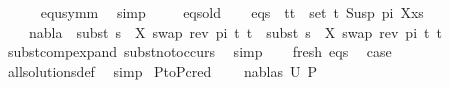 \begin{isabellebody}
\ \ \ \ \isamarkupfalse%
\ equ{\isacharunderscore}{\kern0pt}symm\ \isamarkupfalse%
\ simp\isanewline
\isanewline
\ \ \isamarkupfalse%
\ {}\ eqs{\isacharunderscore}{\kern0pt}old\isanewline
\ \ \isamarkupfalse%
\ eqs{\isacharcolon}{\kern0pt}\ {\isachardoublequoteopen}{\isasymforall}\ {\isacharparenleft}{\kern0pt}t{}{\isacharcomma}{\kern0pt}t{}{\isacharparenright}{\kern0pt}\ {\isasymin}\ set\ {\isacharparenleft}{\kern0pt}{\isacharparenleft}{\kern0pt}t{\isacharprime}{\kern0pt}{\isacharcomma}{\kern0pt}\ Susp\ pi\ X{\isacharparenright}{\kern0pt}{\isacharhash}{\kern0pt}xs{\isacharparenright}{\kern0pt}{\isachardot}{\kern0pt}\ \isanewline
\ \ \ \ nabla{}\ {\isasymturnstile}\ subst\ {\isacharparenleft}{\kern0pt}s{}\ {\isasymbullet}\ {\isacharbrackleft}{\kern0pt}{\isacharparenleft}{\kern0pt}X{\isacharcomma}{\kern0pt}\ swap\ {\isacharparenleft}{\kern0pt}rev\ pi{\isacharparenright}{\kern0pt}\ t{\isacharprime}{\kern0pt}{\isacharparenright}{\kern0pt}{\isacharbrackright}{\kern0pt}{\isacharparenright}{\kern0pt}\ t{}\ {\isasymapprox}\ subst\ {\isacharparenleft}{\kern0pt}s{}\ {\isasymbullet}\ {\isacharbrackleft}{\kern0pt}{\isacharparenleft}{\kern0pt}X{\isacharcomma}{\kern0pt}\ swap\ {\isacharparenleft}{\kern0pt}rev\ pi{\isacharparenright}{\kern0pt}\ t{\isacharprime}{\kern0pt}{\isacharparenright}{\kern0pt}{\isacharbrackright}{\kern0pt}{\isacharparenright}{\kern0pt}\ t{}{\isachardoublequoteclose}\isanewline
\ \ \ \ \isamarkupfalse%
\ subst{\isacharunderscore}{\kern0pt}comp{\isacharunderscore}{\kern0pt}expand\ subst{\isacharunderscore}{\kern0pt}not{\isacharunderscore}{\kern0pt}occurs\ \isamarkupfalse%
\ simp\isanewline
\isanewline
\ \ \isamarkupfalse%
\ fresh\ eqs\ \isamarkupfalse%
\ {\isacharquery}{\kern0pt}case\isanewline
\ \ \ \ \isamarkupfalse%
\ all{\isacharunderscore}{\kern0pt}solutions{\isacharunderscore}{\kern0pt}def\ \isamarkupfalse%
\ simp\isanewline
{}\isamarkupfalse%
%
\endisatagproof
{\isafoldproof}%
%
\isadelimproof
\isanewline
%
\endisadelimproof
\isanewline
{}\isamarkupfalse%
\ P{}{\isacharunderscore}{\kern0pt}to{\isacharunderscore}{\kern0pt}P{}{\isacharunderscore}{\kern0pt}cred{\isacharcolon}{\kern0pt}\ \isanewline
\ \ \ {\isachardoublequoteopen}{\isacharparenleft}{\kern0pt}nabla{}{\isacharcomma}{\kern0pt}s{}{\isacharparenright}{\kern0pt}{\isasymin}\ U\ P{}{\isachardoublequoteclose}\isanewline

\end{isabellebody}
